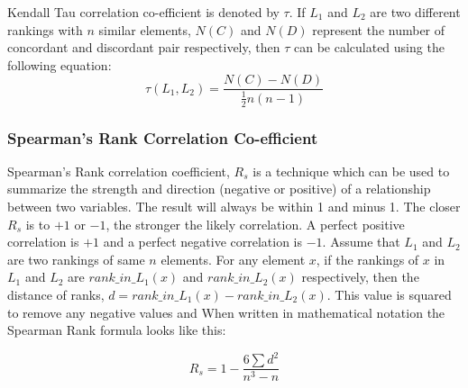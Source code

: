 \documentclass[sigconf]{acmart}
\begin{document}
 
 
Kendall Tau correlation co-efficient is denoted by $\tau$. If $L_1$ and $L_2$ are two different rankings with $n$ similar elements, $N(C)$ and $N(D)$ represent the number of concordant and discordant pair respectively, then $\tau$ can be calculated using the following equation:
\begin{equation}
    \tau(L_1, L_2) = \dfrac{N(C)-N(D)}{\frac{1}{2}n(n-1)}
\end{equation}

\subsubsection{Spearman's Rank Correlation Co-efficient}
Spearman’s Rank correlation coefficient, $R_s$ is a technique which can be used to summarize the strength and direction (negative or positive) of a relationship between two variables.
The result will always be within 1 and minus 1. The closer $R_s$ is to $+1$ or $-1$, the stronger the likely correlation. A perfect positive correlation is $+1$ and a perfect negative correlation is $-1$. Assume that $L_1$ and $L_2$ are two rankings of same $n$ elements. For any element $x$, if the rankings of $x$ in $L_1$ and $L_2$ are $rank\_in\_L_1(x)$ and $rank\_in\_L_2(x)$ respectively, then the distance of ranks, $d = rank\_in\_L_1(x) - rank\_in\_L_2(x)$. This value is squared to remove any negative values and When written in mathematical notation the Spearman Rank formula looks like this:

\begin{equation}
R_s = 1-  \dfrac{6\sum d^2}{n^3-n}
\end{equation}
 
\end{document}
